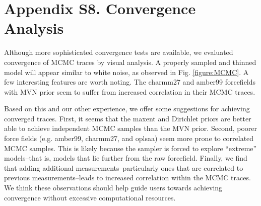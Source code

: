 \documentclass[12pt]{article}
\begin{document}
\section*{Appendix S8.  Convergence Analysis}

Although more sophisticated convergence tests are available, we evaluated convergence of MCMC traces by visual analysis.  A properly sampled and thinned model will appear similar to white noise, as observed in Fig. \ref{figure:MCMC}.  A few interesting features are worth noting.  The charmm27 and amber99 forcefields with MVN prior seem to suffer from increased correlation in their MCMC traces.  

Based on this and our other experience, we offer some suggestions for achieving converged traces.  First, it seems that the maxent and Dirichlet priors are better able to achieve independent MCMC samples than the MVN prior.  Second, poorer force fields (e.g. amber99, charmm27, and oplsaa) seem more prone to correlated MCMC samples.  This is likely because the sampler is forced to explore ``extreme'' models--that is, models that lie further from the raw forcefield.  Finally, we find that adding additional measurements--particularly ones that are correlated to previous measurements--leads to increased correlation within the MCMC traces.  We think these observations should help guide users towards achieving convergence without excessive computational resources.  

\newpage



\end{document}
